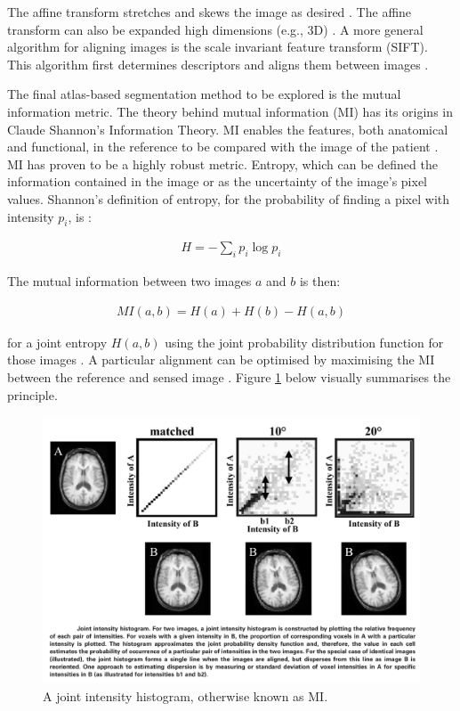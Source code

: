 \documentclass{bmcart}
\begin{document}
The affine transform stretches and skews the image as desired \cite{hajnal_medical_2001}. The affine transform can also be expanded high dimensions (e.g., 3D) \cite{brock_image_2014}. A more general algorithm for aligning images is the scale invariant feature transform (SIFT). This algorithm first determines descriptors and aligns them between images \cite{el-baz_biomedical_2017}.
\par The final atlas-based segmentation method to be explored is the mutual information metric. The theory behind mutual information (MI) has its origins in Claude Shannon's Information Theory. MI enables the features, both anatomical and functional, in the reference to be compared with the image of the patient \cite{zitova_image_2003}. MI has proven to be a highly robust metric. Entropy, which can be defined the information contained in the image or as the uncertainty of the image's pixel values. Shannon's definition of entropy, for the probability of finding a pixel with intensity $p_i$,  is \cite{hutton_software_2003}: 
\begin{ceqn}
\begin{align}
	H = - \sum_i p_i \log{p_i}
\end{align}
\end{ceqn}
The mutual information between two images $a$ and $b$ is then:
\begin{ceqn}
\begin{align}
	MI(a,b) = H(a)+H(b)-H(a,b)
\end{align}
\end{ceqn}
for a joint entropy $H(a,b)$ using the joint probability distribution function for those images \cite{hajnal_medical_2001}. A particular alignment can be optimised by maximising the MI between the reference and sensed image \cite{hutton_software_2003}. Figure \ref{fig:hutton_mi} below visually summarises the principle. 
\begin{figure}[h!] 
  \includegraphics[scale=.5]{figures/hutton_mi.png}
  \caption{ A joint intensity histogram, otherwise known as MI.}
  \label{fig:hutton_mi}
\end{figure}
\end{document}
